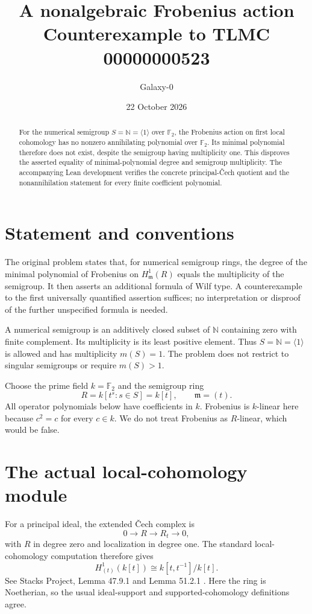\documentclass[11pt]{article}
\title{A nonalgebraic Frobenius action\\Counterexample to TLMC 00000000523}
\author{Galaxy-0}
\date{22 October 2026}
\begin{document}
\maketitle
\begin{abstract}
For the numerical semigroup $S=\mathbb N=\langle1\rangle$ over $\mathbb F_2$, the Frobenius action on first local cohomology has no nonzero annihilating polynomial over $\mathbb F_2$. Its minimal polynomial therefore does not exist, despite the semigroup having multiplicity one. This disproves the asserted equality of minimal-polynomial degree and semigroup multiplicity. The accompanying Lean development verifies the concrete principal-\v Cech quotient and the nonannihilation statement for every finite coefficient polynomial.
\end{abstract}
\section{Statement and conventions}
The original problem states that, for numerical semigroup rings, the degree of the minimal polynomial of Frobenius on $H^1_{\mathfrak m}(R)$ equals the multiplicity of the semigroup. It then asserts an additional formula of Wilf type. A counterexample to the first universally quantified assertion suffices; no interpretation or disproof of the further unspecified formula is needed.

A numerical semigroup is an additively closed subset of $\mathbb N$ containing zero with finite complement. Its multiplicity is its least positive element. Thus $S=\mathbb N=\langle1\rangle$ is allowed and has multiplicity $m(S)=1$. The problem does not restrict to singular semigroups or require $m(S)>1$.

Choose the prime field $k=\mathbb F_2$ and the semigroup ring
\[
 R=k[t^s:s\in S]=k[t],\qquad \mathfrak m=(t).
\]
All operator polynomials below have coefficients in $k$. Frobenius is $k$-linear here because $c^2=c$ for every $c\in k$. We do not treat Frobenius as $R$-linear, which would be false.

\section{The actual local-cohomology module}
For a principal ideal, the extended \v Cech complex is
\[
0\longrightarrow R\longrightarrow R_t\longrightarrow0,
\]
with $R$ in degree zero and localization in degree one. The standard local-cohomology computation therefore gives
\begin{equation}\label{cech}
 H^1_{(t)}(k[t])\cong k[t,t^{-1}]/k[t].
\end{equation}
See Stacks Project, Lemma 47.9.1 and Lemma 51.2.1 \cite{stacks1,stacks2}. Here the ring is Noetherian, so the usual ideal-support and supported-cohomology definitions agree.
\end{document}
